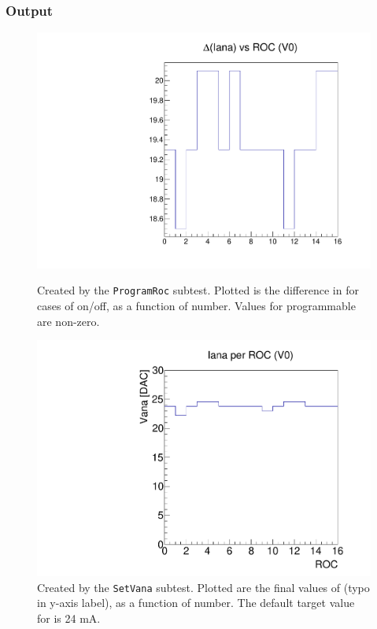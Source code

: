 \subsubsection{Output}

\begin{figure}[!htp]
\centering
\begin{minipage}{0.45\textwidth}
  \includegraphics[width=1.0\textwidth]{figures/pretest_programROC.pdf}
  \caption{Created by the {\tt ProgramRoc} subtest. 
    Plotted is the difference in \iana for cases of \vana on/off, as a function of \roc number.
    Values for programmable \rocs are non-zero.}
  \label{fig:pretest_programROC}
\end{minipage}
\hspace{0.3cm}
\begin{minipage}{0.45\textwidth}
  \includegraphics[width=1.0\textwidth]{figures/pretest_Iana.pdf}
  \caption{Created by the {\tt SetVana} subtest.  
    Plotted are the final values of \iana (typo in y-axis label), as a function of \roc number.
    The default target value for \iana is 24 mA.}
  \label{fig:pretest_Iana}
\end{minipage}
\end{figure}

